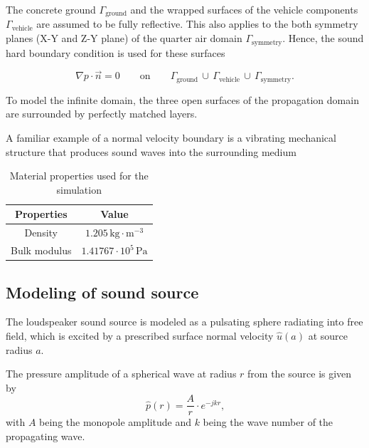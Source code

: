 The concrete ground $\Gamma_{\text{ground}}$ and the wrapped surfaces of the vehicle components $\Gamma_{\text{vehicle}}$ are assumed to be fully reflective. This also applies to the both symmetry planes (X-Y and Z-Y plane) of the quarter air domain $\Gamma_{\text{symmetry}}$. Hence, the sound hard boundary condition is used for these surfaces

\begin{equation}
	\nabla p \cdot \vec{n} = 0\qquad\text{on}\qquad\Gamma_{\text{ground}}\,\cup\,\Gamma_{\text{vehicle}}\,\cup\,\Gamma_{\text{symmetry}}\text{.}
\end{equation}


To model the infinite domain, the three open surfaces of the propagation domain are surrounded by perfectly matched layers.


A familiar example of a normal velocity boundary is a vibrating mechanical structure that produces sound waves into the surrounding medium



\begin{table}[H]
	\centering
	\caption{Material properties used for the simulation}
	\begin{tabular}{|c|c|}
		\hline
		\textbf{Properties} & \textbf{Value}                   \\ \hline
		Density             &  $1.205\,\text{kg}\cdot \text{m}^{-3}$                     \\ \hline
		Bulk modulus        &  $1.41767\cdot10^5\,\text{Pa}$ \\ \hline
	\end{tabular}
\end{table}

\subsection*{Modeling of sound source}

The loudspeaker sound source is modeled as a pulsating sphere radiating into free field, which is excited by a prescribed surface normal velocity $\hat{u}(a)$ at source radius $a$.

The pressure amplitude of a spherical wave at radius $r$ from the source is given by
\begin{equation}
	\hat{p}(r) = \frac{A}{r}\cdot e^{-jkr}\text{,}
\end{equation}
with $A$ being the monopole amplitude and $k$ being the wave number of the propagating wave.

